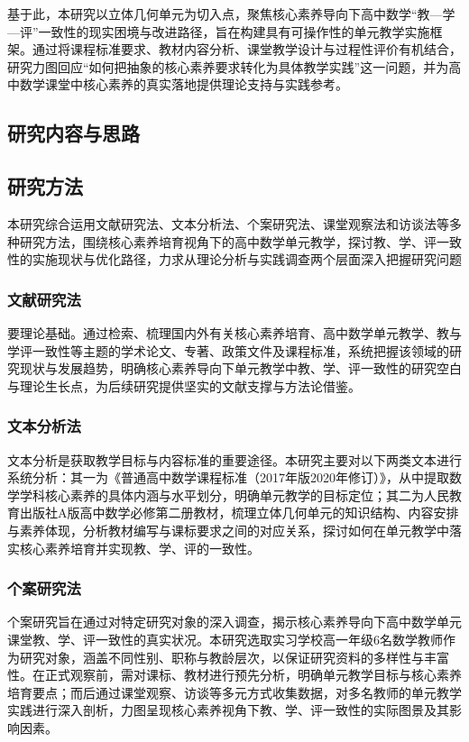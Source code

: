 \documentclass[UTF8,a4paper,12pt,twoside]{ctexart}
\begin{document}
基于此，本研究以立体几何单元为切入点，聚焦核心素养导向下高中数学“教—学—评”一致性的现实困境与改进路径，旨在构建具有可操作性的单元教学实施框架。通过将课程标准要求、教材内容分析、课堂教学设计与过程性评价有机结合，研究力图回应“如何把抽象的核心素养要求转化为具体教学实践”这一问题，并为高中数学课堂中核心素养的真实落地提供理论支持与实践参考。
\subsection{研究内容与思路}

\subsection{研究方法}
本研究综合运用文献研究法、文本分析法、个案研究法、课堂观察法和访谈法等多种研究方法，围绕核心素养培育视角下的高中数学单元教学，探讨教、学、评一致性的实施现状与优化路径，力求从理论分析与实践调查两个层面深入把握研究问题
\subsubsection{文献研究法}
要理论基础。通过检索、梳理国内外有关核心素养培育、高中数学单元教学、教与学评一致性等主题的学术论文、专著、政策文件及课程标准，系统把握该领域的研究现状与发展趋势，明确核心素养导向下单元教学中教、学、评一致性的研究空白与理论生长点，为后续研究提供坚实的文献支撑与方法论借鉴。
\subsubsection{文本分析法}
文本分析是获取教学目标与内容标准的重要途径。本研究主要对以下两类文本进行系统分析：其一为《普通高中数学课程标准（2017年版2020年修订）》，从中提取数学学科核心素养的具体内涵与水平划分，明确单元教学的目标定位；其二为人民教育出版社A版高中数学必修第二册教材，梳理立体几何单元的知识结构、内容安排与素养体现，分析教材编写与课标要求之间的对应关系，探讨如何在单元教学中落实核心素养培育并实现教、学、评的一致性。
\subsubsection{个案研究法}
个案研究旨在通过对特定研究对象的深入调查，揭示核心素养导向下高中数学单元课堂教、学、评一致性的真实状况。本研究选取实习学校高一年级6名数学教师作为研究对象，涵盖不同性别、职称与教龄层次，以保证研究资料的多样性与丰富性。在正式观察前，需对课标、教材进行预先分析，明确单元教学目标与核心素养培育要点；而后通过课堂观察、访谈等多元方式收集数据，对多名教师的单元教学实践进行深入剖析，力图呈现核心素养视角下教、学、评一致性的实际图景及其影响因素。
\end{document}
